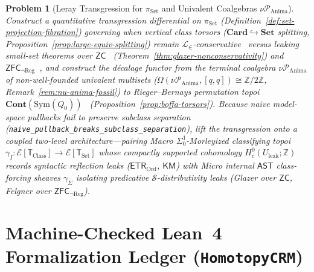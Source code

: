 \documentclass[10pt,twoside,openright]{book}
\theoremstyle{crmplain}
\newtheorem{problem}{Problem}[chapter]
\theoremstyle{crmdef}
\theoremstyle{crmremark}
\begin{document}
\begin{problem}[Leray Transgression for $\pi_{\mathrm{Set}}$ and Univalent Coalgebras $\nu\mathcal{P}_{\mathrm{Anima}}$]\label{prob:open-17}
Construct a quantitative transgression differential on $\pi_{\mathrm{Set}}$ (Definition~\ref{def:set-projection-fibration}) governing when vertical class torsors ($\mathbf{Card} \hookrightarrow \mathbf{Set}$ splitting, Proposition~\ref{prop:large-equiv-splitting}) remain $\mathcal{L}_\in$-conservative~\cite{Felgner71} versus leaking small-set theorems over $\mathsf{ZC}$~\cite{Glazer23} (Theorem~\ref{thm:glazer-nonconservativity}) and $\mathsf{ZFC}_{\neg\mathrm{Reg}}$~\cite{Felgner76}, and construct the d\'ecalage functor from the terminal coalgebra $\nu\mathcal{P}_{\mathrm{Anima}}$ of non-well-founded univalent multisets ($\Omega(\nu\mathcal{P}_{\mathrm{Anima}}, [q,q]) \cong \mathbb{Z}/2\mathbb{Z}$, Remark~\ref{rem:nu-anima-fossil}) to Rieger--Bernays permutation topoi $\mathbf{Cont}(\mathrm{Sym}(Q_0))$~\cite{Bernays54,Rieger57,Boffa69} (Proposition~\ref{prop:boffa-torsors}). Because naive model-space pullbacks fail to preserve subclass separation (\texttt{naive\_\allowbreak pullback\_\allowbreak breaks\_\allowbreak subclass\_\allowbreak separation}), lift the transgression onto a coupled two-level architecture---pairing Macro $\Sigma^1_0$-Morleyized classifying topoi $\gamma_I \colon \mathcal{E}[\mathbb{T}_{\mathrm{Class}}] \to \mathcal{E}[\mathbb{T}_{\mathrm{Set}}]$ whose compactly supported cohomology $H^0_c(U_{\mathrm{leak}}; \mathbb{Z})$ records syntactic reflection leaks ($\mathsf{ETR}_{\mathrm{Ord}}$, $\mathsf{KM}$) with Micro internal $\mathsf{AST}$ class-forcing sheaves $\gamma_\Sigma$ isolating predicative $\mathcal{S}$-distributivity leaks (Glazer over $\mathsf{ZC}$, Felgner over $\mathsf{ZFC}_{\neg\mathrm{Reg}}$).
\end{problem}

\section{\texorpdfstring{Machine-Checked Lean~4 Formalization Ledger (\texttt{HomotopyCRM})}{Machine-Checked Lean 4 Formalization Ledger (HomotopyCRM)}}\label{subsec:lean4-verification-ledger}
\end{document}
